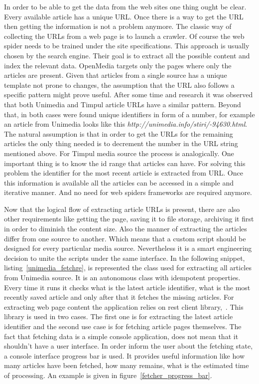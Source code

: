 In order to be able to get the data from the web sites one thing ought be clear. Every available article has a unique URL. Once there is a way to get the URL then getting the information is not a problem anymore. The classic way of collecting the URLs from a web page is to launch a crawler. Of course the web spider needs to be trained under the site specifications. This approach is usually chosen by the search engine. Their goal is to extract all the possible content and index the relevant data. OpenMedia targets only the pages where only the articles are present. Given that articles from a single source has a unique template not prone to changes, the assumption that the URL also follows a specific pattern might prove useful. After some time and research it was observed that both Unimedia and Timpul article URLs have a similar pattern. Beyond that, in both cases were found unique identifiers in form of a number, for example an article from Unimedia looks like this \emph{http://unimedia.info/stiri/-94630.html}. The natural assumption is that in order to get the URLs for the remaining articles the only thing needed is to decrement the number in the URL string mentioned above. For Timpul media source the process is analogically. One important thing is to know the id range that articles can have. For solving this problem the identifier for the most recent article is extracted from URL. Once this information is available all the articles can be accessed in a simple and iterative manner. And no need for web spiders frameworks are required anymore.

Now that the logical flow of extracting article URLs is present, there are also other requirements like getting the page, saving it to file storage, archiving it first in order to diminish the content size. Also the manner of extracting the articles differ from one source to another. Which means that a custom script should be designed for every particular media source. Nevertheless it is a smart engineering decision to unite the scripts under the same interface. In the following snippet, \mbox{listing \ref{unimedia_fetchre}}, is represented the class used for extracting all articles from Unimedia source. It is an autonomous class with idempotent properties. Every time it runs it checks what is the latest article identifier, what is the most recently saved article and only after that it fetches the missing articles. For extracting web page content the application relies on rest client \mbox{library, \cite{rest_client_ruby}}. This library is used in two cases. The first one is for extracting the latest article identifier and the second use case is for fetching article pages themselves. The fact that fetching data is a simple console application, does not mean that it shouldn't have a user interface. In order inform the user about the fetching state, a console interface progress bar is used. It provides useful information like how many articles have been fetched, how many remains, what is the estimated time of processing. An example is given in \mbox{figure \ref{fetcher_progress_bar}}.

